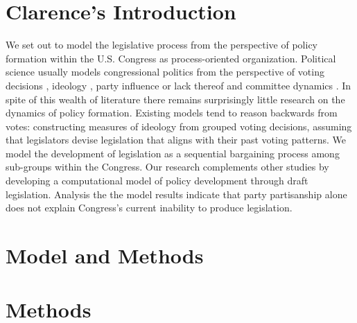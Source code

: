 \documentclass[pdftex,12pt]{llncs}
\begin{document}
\section{Clarence's Introduction}
%
%
%
%
We set out to model the legislative process from the perspective of policy formation within the U.S. Congress as process-oriented organization. 
Political science usually models congressional politics from the perspective of voting decisions \parencite{m74, k89}, ideology \parencite{pr97}, party influence \parencite{cm93,cm05,a95} or lack thereof \parencite{k91, k98} and committee dynamics \parencite{sw87, gk89, m04}. 
In spite of this wealth of literature there remains surprisingly little research on the dynamics of policy formation. 
Existing models tend to reason backwards from votes: constructing measures of ideology from grouped voting decisions, assuming that legislators devise legislation that aligns with their past voting patterns.   
We model the development of legislation as a sequential bargaining process among sub-groups within the Congress. 
Our research complements other studies by developing a computational model of policy development through draft legislation.
Analysis the the model results indicate that party partisanship alone does not explain Congress's current inability to produce legislation.  


\section{Model and Methods}
\section{Methods}
%
%
\end{document}
